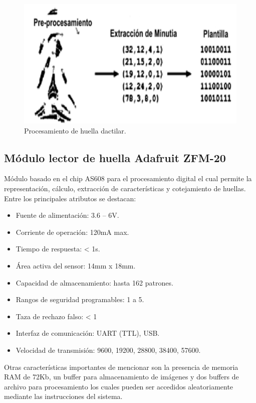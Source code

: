 \begin{figure}[h]
	\centering
	\includegraphics[scale=.2]{./Figures/huella.png}
	\caption{Procesamiento de huella dactilar.}
	\label{fig:huella}
\end{figure}

\subsection{Módulo lector de huella Adafruit ZFM-20}
Módulo basado en el chip AS608 para el procesamiento digital el cual permite la representación, cálculo, extracción de características y  cotejamiento de huellas.
Entre los principales atributos se destacan:

\begin{itemize}
\item Fuente de alimentación: 3.6 – 6V. 
\item Corriente de operación: 120mA max.
\item Tiempo de respuesta: < 1s.
\item Área activa del sensor: 14mm x 18mm.
\item Capacidad de almacenamiento: hasta 162 patrones.
\item Rangos de seguridad programables: 1 a 5.
\item Taza de rechazo falso: < 1 %
\item Interfaz de comunicación: UART (TTL), USB.
\item Velocidad de transmisión: 9600, 19200, 28800, 38400, 57600.
\end{itemize}

Otras características importantes de mencionar son la presencia de memoria RAM de 72Kb, un buffer para almacenamiento de imágenes y dos buffers de archivo para procesamiento los cuales pueden ser accedidos aleatoriamente mediante las instrucciones del sistema. 

